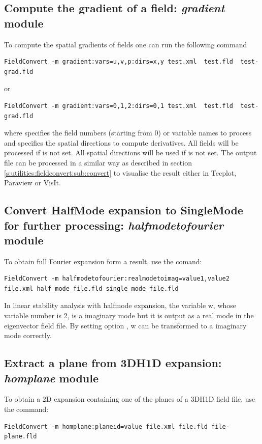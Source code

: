 \subsection{Compute the gradient of a field: \textit{gradient} module}
To compute the spatial gradients of fields one can run the following command
%
\begin{lstlisting}[style=BashInputStyle]
FieldConvert -m gradient:vars=u,v,p:dirs=x,y test.xml  test.fld  test-grad.fld
\end{lstlisting}
or
\begin{lstlisting}[style=BashInputStyle]
  FieldConvert -m gradient:vars=0,1,2:dirs=0,1 test.xml  test.fld  test-grad.fld
\end{lstlisting}
%
where  specifies the field numbers (starting from 0) or variable names to process and
 specifies the spatial directions to compute derivatives. All fields will be
processed if  is not set. All spatial directions will be used if  is not set.
The output file  can be processed in a similar
way as described in section \ref{s:utilities:fieldconvert:sub:convert}
to visualise the result either in Tecplot, Paraview or VisIt.
%
%

\subsection{Convert HalfMode expansion to SingleMode for further processing: \textit{halfmodetofourier} module}

To obtain full Fourier expansion form a  result, use the comand:
\begin{lstlisting}[style=BashInputStyle]
  FieldConvert -m halfmodetofourier:realmodetoimag=value1,value2 file.xml half_mode_file.fld single_mode_file.fld
\end{lstlisting}

In linear stability analysis with halfmode expansion, the variable w, whose variable number is 2, is a imaginary mode but it is output as a real mode in the eigenvector field file. By setting option , w can be transformed to a imaginary mode correctly.

\subsection{Extract a plane from 3DH1D expansion: \textit{homplane} module}

To obtain a 2D expansion containing one of the planes of a
3DH1D field file, use the command:
\begin{lstlisting}[style=BashInputStyle]
FieldConvert -m homplane:planeid=value file.xml file.fld file-plane.fld
\end{lstlisting}

